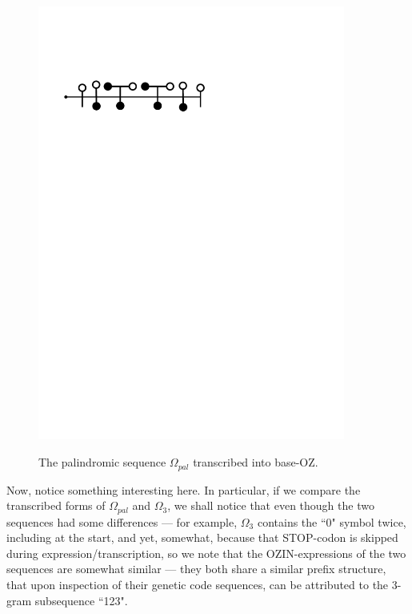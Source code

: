 \documentclass[a4paper, 18pt]{book} %
\begin{document}
\begin{figure}[H]
  \begin{center}
   \includegraphics[trim=0cm 22cm 7cm 5cm, clip, width=0.9\textwidth,]{resources/pdfs/OZINCIPHER-APP4-PAL.pdf}\\
   \caption{The palindromic sequence $\Omega_{pal}$ transcribed into base-OZ.}
  \label{FIGOZPAL}
  \end{center}
\end{figure}

Now, notice something interesting here. In particular, if we compare the transcribed forms of $\Omega_{pal}$ and $\Omega_{3}$, we shall notice that even though the two sequences had some differences --- for example, $\Omega_{3}$ contains the ``0" symbol twice, including at the start, and yet, somewhat, because that STOP-codon is skipped during expression/transcription, so we note that the OZIN-expressions of the two sequences are somewhat similar --- they both share a similar prefix structure, that upon inspection of their genetic code sequences, can be attributed to the 3-gram subsequence ``123".
\end{document}
